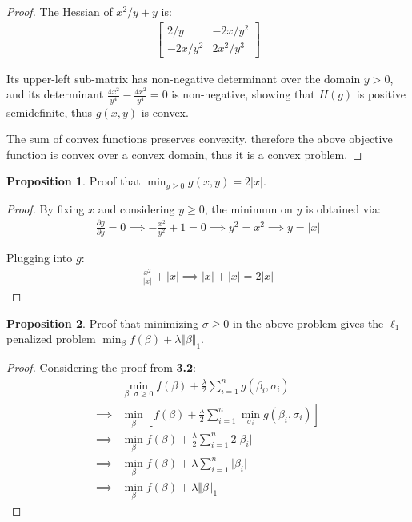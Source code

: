 \documentclass[12pt]{article}
\newcommand{\mo}[1]{\lvert #1 \rvert}
\theoremstyle{definition}
\newtheorem{prop}{Proposition}[section]
\begin{document}
	\begin{proof}
		The Hessian of $x^2/y + y$ is:
		\begin{gather*}
		\begin{bmatrix}
			2/y & -2x / y^2 \\
			-2x / y^2 & 2x^2 / y^3
		\end{bmatrix}
		\end{gather*}
		
		Its upper-left sub-matrix has non-negative determinant over the domain $y > 0$, and its determinant $\frac{4x^2}{y^4} - \frac{4x^2}{y^4} = 0$ is non-negative, showing that $H(g)$ is positive semidefinite, thus $g(x, y)$ is convex.
		
		The sum of convex functions preserves convexity, therefore the above objective function is convex over a convex domain, thus it is a convex problem.
	\end{proof}
	
	\begin{prop}
		Proof that $\min_{y \geq 0} g(x, y) = 2 \mo{x}$.
	\end{prop}
	
	\begin{proof}
		By fixing $x$ and considering $y \geq 0$, the minimum on $y$ is obtained via:
		\begin{gather*}
			\frac{\partial g}{\partial y} = 0 \implies -\frac{x^2}{y^2} + 1 = 0 \implies  y^2 = x^2 \implies y = \mo{x}
		\end{gather*}
		
		Plugging into $g$:
		\begin{gather*}
			\frac{x^2}{\mo{x}} + \mo{x} \implies \mo{x} + \mo{x} = 2\mo{x}
		\end{gather*}
	\end{proof}
	
	\begin{prop}
		Proof that minimizing $\sigma \geq 0$ in the above problem gives the $\ell_1$ penalized problem $\min_\beta f(\beta) + \lambda \Vert \beta \Vert_1$.
	\end{prop}
	
	\begin{proof}
		Considering the proof from \textbf{3.2}:
		\begin{align*}
			&\min_{\beta,\ \sigma \geq 0} f(\beta) + \frac{\lambda}{2}\sum_{i=1}^{n} g(\beta_i, \sigma_i) \\
			\implies &\min_\beta \left[ f(\beta) + \frac{\lambda}{2}\sum_{i=1}^{n} \min_{\sigma_i} g(\beta_i, \sigma_i) \right] \\
			\implies &\min_\beta f(\beta) + \frac{\lambda}{2}\sum_{i=1}^{n} 2 \lvert \beta_i \rvert \\
			\implies &\min_\beta f(\beta) + \lambda \sum_{i=1}^{n} \lvert \beta_i \rvert \\
			\implies &\min_\beta f(\beta) + \lambda \Vert \beta \Vert_1
		\end{align*}
	\end{proof}
	
\end{document}
